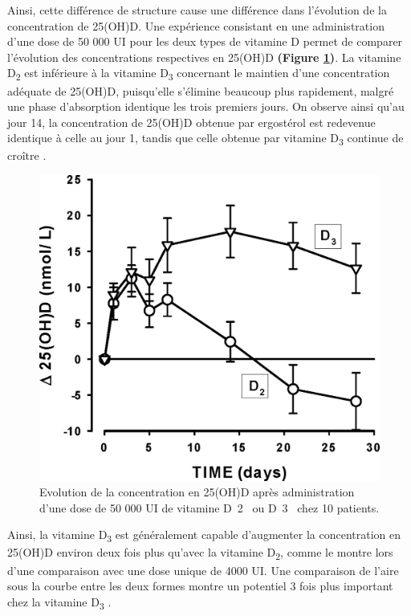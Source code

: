 \documentclass[
  a4paper,
  DIV=11,
  numbers=noendperiod,
  listof=totoc]{scrreprt}
\begin{document}
Ainsi, cette différence de structure cause une différence dans
l'évolution de la concentration de 25(OH)D. Une expérience consistant en
une administration d'une dose de 50 000 UI pour les deux types de
vitamine D permet de comparer l'évolution des concentrations respectives
en 25(OH)D \textbf{(Figure \ref{fig:PK-VD})}. La vitamine
D\textsubscript{2} est inférieure à la vitamine D\textsubscript{3}
concernant le maintien d'une concentration adéquate de 25(OH)D,
puisqu'elle s'élimine beaucoup plus rapidement, malgré une phase
d'absorption identique les trois premiers jours. On observe ainsi qu'au
jour 14, la concentration de 25(OH)D obtenue par ergostérol est
redevenue identique à celle au jour 1, tandis que celle obtenue par
vitamine D\textsubscript{3} continue de croître \autocite{Armas.2004}.

\begin{figure}
\includegraphics{figures/PK_D2_vs_D3.jpeg} 
\caption[\textbf{Evolution de la concentration en 25(OH)D après administration d'une
dose de 50 000 UI de vitamine D~2~ ou D~3~ chez 10 patients.}]{Evolution de la concentration en 25(OH)D après administration d'une
dose de 50 000 UI de vitamine D~2~ ou D~3~ chez 10 patients. \cite{Armas.2004}}
\label{fig:PK-VD}
\end{figure}

Ainsi, la vitamine D\textsubscript{3} est généralement capable
d'augmenter la concentration en 25(OH)D environ deux fois plus qu'avec
la vitamine D\textsubscript{2}, comme le montre \textcite{Trang.1998}
lors d'une comparaison avec une dose unique de 4000 UI. Une comparaison
de l'aire sous la courbe entre les deux formes montre un potentiel 3
fois plus important chez la vitamine D\textsubscript{3}
\autocite{Armas.2004}.
\end{document}
